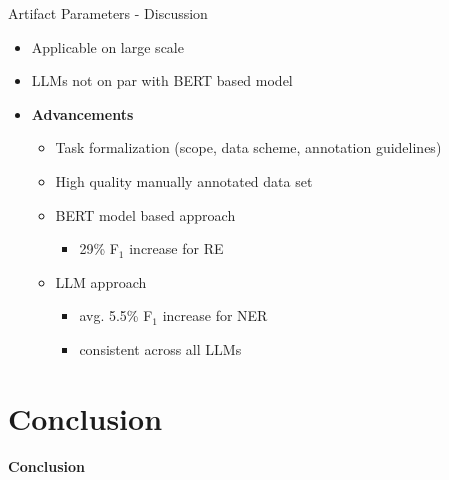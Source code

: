 \documentclass[en,16:9,smallfoot]{sdqbeamer}
\begin{document}
   \begin{frame}{Artifact Parameters - Discussion}
        \begin{itemize}
        \item Applicable on large scale
        \item LLMs not on par with BERT based model
        \item \textbf{Advancements}
            \begin{itemize}
            \item Task formalization (scope, data scheme, annotation guidelines)
            \item High quality manually annotated data set
            \item BERT model based approach
            \begin{itemize}
                \item 29\% F${}_1$ increase for RE
            \end{itemize}
            \item LLM approach
            \begin{itemize}
                \item avg. 5.5\% F${}_1$ increase for NER
                \item consistent across all LLMs
            \end{itemize}
            \end{itemize}
        \end{itemize}
   \end{frame}

\section{Conclusion}

   \begin{frame}[plain]
        \vspace{0.7cm}
        \begin{infobox-map}
        \centering
        \begin{Huge}
        \textbf{Conclusion}\\
        \end{Huge}
        \end{infobox-map}
   \end{frame}
\end{document}
